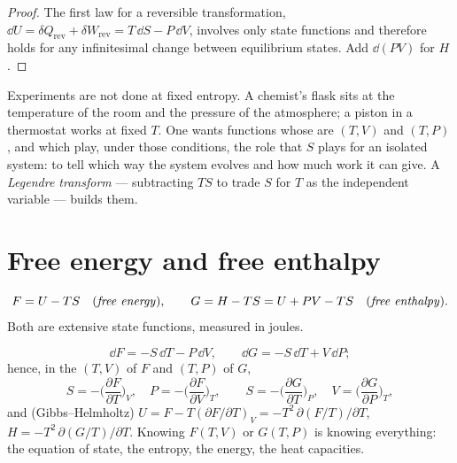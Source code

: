 \begin{proof}
The first law for a reversible transformation, $\dd U = \delta Q_{\text{rev}}
+ \delta W_{\text{rev}} = T\,\dd S - P\,\dd V$, involves only state
functions and therefore holds for any infinitesimal change between
equilibrium states. Add $\dd(PV)$ for $H$.
\end{proof}

\begin{remark}\label{rem:b2:thermodynamic-potentials:why}
Experiments are not done at fixed entropy. A chemist's flask sits at
the temperature of the room and the pressure of the atmosphere; a
piston in a thermostat works at fixed $T$. One wants functions whose
 are $(T,V)$ and $(T,P)$, and which play, under those
conditions, the role that $S$ plays for an isolated system: to tell
which way the system evolves and how much work it can give. A
\emph{Legendre transform} --- subtracting $TS$ to trade $S$ for $T$ as
the independent variable --- builds them.
\end{remark}

\section{Free energy and free enthalpy}

\begin{definition}\label{def:b2:thermodynamic-potentials:FG}
\[
F = U - TS \quad\text{(\emph{free energy}\index{free energy})}, \qquad
G = H - TS = U + PV - TS \quad\text{(\emph{free enthalpy}\index{free enthalpy})}.
\]
Both are extensive state functions, measured in joules.
\end{definition}

\begin{theorem}\label{thm:b2:thermodynamic-potentials:dFdG}
\[
\dd F = -S\,\dd T - P\,\dd V, \qquad
\dd G = -S\,\dd T + V\,\dd P ;
\]
hence, in the  $(T,V)$ of $F$ and $(T,P)$ of $G$,
\[
S = -\Big(\frac{\partial F}{\partial T}\Big)_V, \quad
P = -\Big(\frac{\partial F}{\partial V}\Big)_T, \qquad
S = -\Big(\frac{\partial G}{\partial T}\Big)_P, \quad
V = \Big(\frac{\partial G}{\partial P}\Big)_T ,
\]
and (Gibbs--Helmholtz) $U = F - T(\partial F/\partial T)_V =
-T^2\,\partial(F/T)/\partial T$, $H = -T^2\,\partial(G/T)/\partial T$.
Knowing $F(T,V)$ or $G(T,P)$ is knowing everything: the equation of
state, the entropy, the energy, the heat capacities.
\end{theorem}

